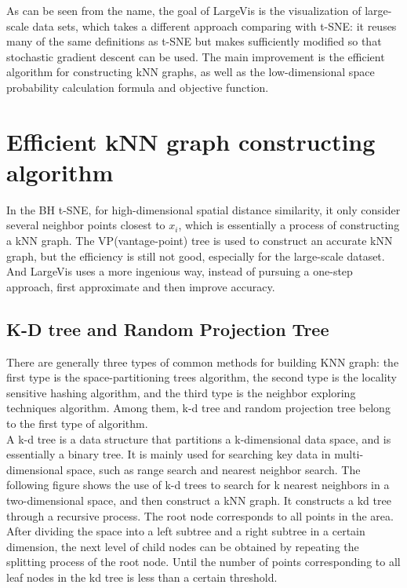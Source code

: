 \noindent As can be seen from the name, the goal of LargeVis\cite{ref5} is the visualization of large-scale data sets, which takes a different approach comparing with t-SNE: it reuses many of the same definitions as t-SNE but makes sufficiently modified so that stochastic gradient descent can be used. The main improvement is the efficient algorithm for constructing kNN graphs, as well as the low-dimensional space probability calculation formula and objective function.

\section{Efficient kNN graph constructing algorithm}

In the BH t-SNE, for high-dimensional spatial distance similarity, it only consider several neighbor points closest to $x_i$, which is essentially a process of constructing a kNN graph. The VP(vantage-point) tree is used to construct an accurate kNN graph, but the efficiency is still not good, especially for the large-scale dataset. And LargeVis uses a more ingenious way, instead of pursuing a one-step approach, first approximate and then improve accuracy.\\

\subsection{K-D tree and Random Projection Tree}

There are generally three types of common methods for building KNN graph: the first type is the space-partitioning trees algorithm, the second type is the locality sensitive hashing algorithm, and the third type is the neighbor exploring techniques algorithm. Among them, k-d tree and random projection tree belong to the first type of algorithm.\\

\noindent A k-d tree is a data structure that partitions a k-dimensional data space, and is essentially a binary tree. It is mainly used for searching key data in multi-dimensional space, such as range search and nearest neighbor search. The following figure shows the use of k-d trees to search for k nearest neighbors in a two-dimensional space, and then construct a kNN graph. It constructs a kd tree through a recursive process. The root node corresponds to all points in the area. After dividing the space into a left subtree and a right subtree in a certain dimension, the next level of child nodes can be obtained by repeating the splitting process of the root node. Until the number of points corresponding to all leaf nodes in the kd tree is less than a certain threshold.\\

